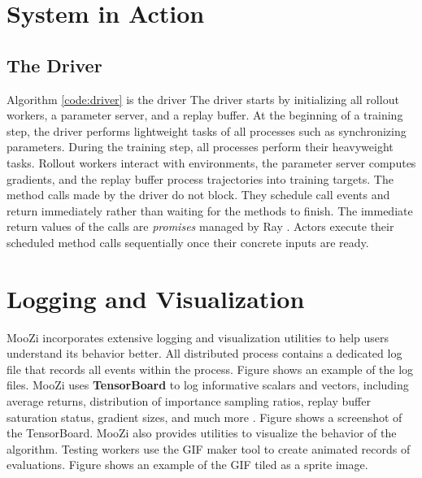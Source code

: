 \section{System in Action}
\subsection{The Driver}
Algorithm \ref{code:driver} is the driver 
The driver starts by initializing all rollout workers, a parameter server, and a replay buffer.
At the beginning of a training step, the driver performs lightweight tasks of all processes such as synchronizing parameters.
During the training step, all processes perform their heavyweight tasks.
Rollout workers interact with environments, the parameter server computes gradients, and the replay buffer process trajectories into training targets.
The method calls made by the driver do not block.
They schedule call events and return immediately rather than waiting for the methods to finish.
The immediate return values of the calls are \textit{promises} managed by Ray \cite{FuturesPromises__2022}.
Actors execute their scheduled method calls sequentially once their concrete inputs are ready.

\section{Logging and Visualization} \label{sec:logging}
MooZi incorporates extensive logging and visualization utilities to help users understand its behavior better.
All distributed process contains a dedicated log file that records all events within the process.
Figure  shows an example of the log files.
MooZi uses \textbf{TensorBoard} to log informative scalars and vectors, including average returns, distribution of importance sampling ratios, replay buffer saturation status, gradient sizes, and much more \cite{TensorFlowLargeScaleMachine_Abadi.Agarwal.ea_}.
Figure  shows a screenshot of the TensorBoard.
MooZi also provides utilities to visualize the behavior of the algorithm.
Testing workers use the GIF maker tool to create animated records of evaluations.
Figure  shows an example of the GIF tiled as a sprite image.
